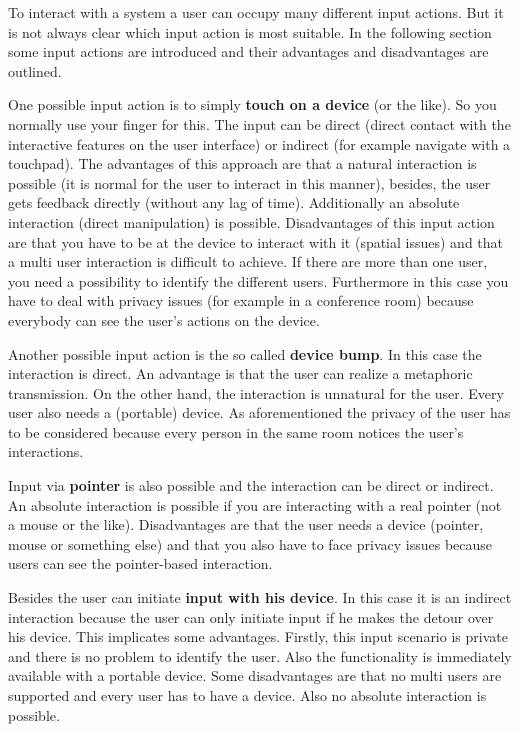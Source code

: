 To interact with a system a user can occupy many different input actions.
But it is not always clear which input action is most suitable.
In the following section some input actions are introduced and their advantages and disadvantages are outlined.

One possible input action is to simply \textbf{touch on a device} (or the like).
So you normally use your finger for this.
The input can be direct (direct contact with the interactive features on the user interface) or indirect (for example navigate with a touchpad).
The advantages of this approach are that a natural interaction is possible (it is normal for the user to interact in this manner), besides, the user gets feedback directly (without any lag of time). Additionally an absolute interaction (direct manipulation) is possible.
Disadvantages of this input action are that you have to be at the device to interact with it (spatial issues) and that a multi user interaction is difficult to achieve.
If there are more than one user, you need a possibility to identify the different users.
Furthermore in this case you have to deal with privacy issues (for example in a conference room) because everybody can see the user’s actions on the device.

Another possible input action is the so called \textbf{device bump}.
In this case the interaction is direct.
An advantage is that the user can realize a metaphoric transmission.
On the other hand, the interaction is unnatural for the user.
Every user also needs a (portable) device.
As aforementioned the privacy of the user has to be considered because every person in the same room notices the user’s interactions. 

Input via \textbf{pointer} is also possible and the interaction can be direct or indirect.
An absolute interaction is possible if you are interacting with a real pointer (not a mouse or the like).
Disadvantages are that the user needs a device (pointer, mouse or something else) and that you also have to face privacy issues because users can see the pointer-based interaction.

Besides the user can initiate \textbf{input with his device}.
In this case it is an indirect interaction because the user can only initiate input if he makes the detour over his device. This implicates some advantages.
Firstly, this input scenario is private and there is no problem to identify the user.
Also the functionality is immediately available with a portable device.
Some disadvantages are that no multi users are supported and every user has to have a device.
Also no absolute interaction is possible.

